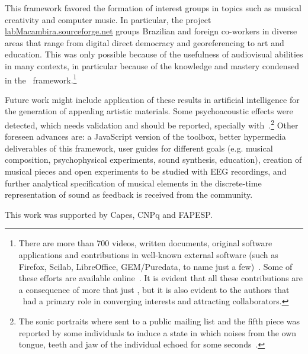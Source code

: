 This framework favored the formation of interest groups in topics such as musical creativity and computer music.
In particular, the project \url{labMacambira.sourceforge.net} groups Brazilian and foreign co-workers
in diverse areas that range from digital direct democracy and georeferencing to art and education.
This was only possible because of the usefulness of audiovisual abilities in many contexts, in particular because of the knowledge and mastery condensed in the \massa\ framework.\footnote{There are more than 700 videos, written documents,
 original software applications and contributions in well-known external software (such as Firefox, Scilab, LibreOffice, GEM/Puredata, to name just a few)~\cite{siteLM,wikiLM,vimeoLM}.
Some of these efforts are available online~\cite{dissertacao}.
It is evident that all these contributions are a consequence of more that just \massa, but it is also evident to the authors that \massa\ had a primary role in converging interests and attracting collaborators.}

Future work might include application of these results in artificial intelligence
for the generation of appealing artistic materials. Some psychoacoustic effects were detected,
which needs validation and should be reported, specially with~\cite{quadrosSonoros}.\footnote{The sonic portraits where sent to a public mailing list and the fifth piece was reported by some individuals to induce a state in which noises from the own tongue, teeth and jaw of the individual echoed for some seconds~\cite{quadrosMetarec}.} Other foreseen advances
are: a JavaScript version of the toolbox, better hypermedia deliverables of this framework, user guides
for different goals (e.g. musical composition, psychophysical experiments, sound synthesis, education), creation
of musical pieces and open experiments to be studied with EEG recordings, and further analytical specification of musical
elements in the discrete-time representation of sound as feedback is received from the community.

\begin{acks}
This work was supported by Capes, CNPq and FAPESP.
\end{acks}


% 

